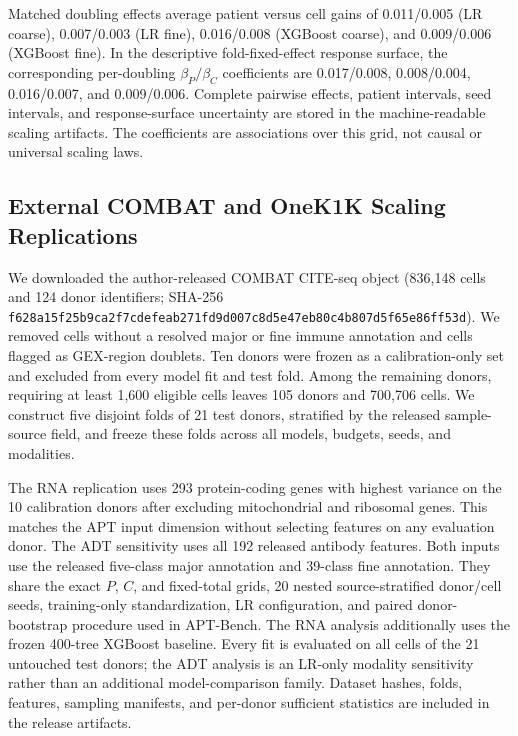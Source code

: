 Matched doubling effects average patient versus cell gains of
0.011/0.005 (LR coarse), 0.007/0.003 (LR fine), 0.016/0.008 (XGBoost coarse),
and 0.009/0.006 (XGBoost fine). In the descriptive fold-fixed-effect response
surface, the corresponding per-doubling $\beta_P/\beta_C$ coefficients are
0.017/0.008, 0.008/0.004, 0.016/0.007, and 0.009/0.006. Complete pairwise
effects, patient intervals, seed intervals, and response-surface uncertainty
are stored in the machine-readable scaling artifacts. The coefficients are
associations over this grid, not causal or universal scaling laws.

\subsection{External COMBAT and OneK1K Scaling Replications}
\label{sec:appendix:combat_scaling}

We downloaded the author-released COMBAT CITE-seq object
\citep{combat2022blood} (836{,}148 cells and 124 donor identifiers; SHA-256
\texttt{f628a15f25b9ca2f7cdefeab271fd9d007c8d5e47eb80c4b807d5f65e86ff53d}).
We removed cells without a resolved major or fine immune annotation and cells
flagged as GEX-region doublets. Ten donors were frozen as a calibration-only
set and excluded from every model fit and test fold. Among the remaining
donors, requiring at least 1{,}600 eligible cells leaves 105 donors and
700{,}706 cells. We construct five disjoint folds of 21 test donors, stratified
by the released sample-source field, and freeze these folds across all models,
budgets, seeds, and modalities.

The RNA replication uses 293 protein-coding genes with highest variance on the
10 calibration donors after excluding mitochondrial and ribosomal genes. This
matches the APT input dimension without selecting features on any evaluation
donor. The ADT sensitivity uses all 192 released antibody features. Both inputs
use the released five-class major annotation and 39-class fine annotation.
They share the exact $P$, $C$, and fixed-total grids, 20 nested source-stratified
donor/cell seeds, training-only standardization, LR configuration, and paired
donor-bootstrap procedure used in APT-Bench. The RNA analysis additionally
uses the frozen 400-tree XGBoost baseline. Every fit is evaluated on all cells
of the 21 untouched test donors; the ADT analysis is an LR-only modality
sensitivity rather than an additional model-comparison family. Dataset hashes,
folds, features, sampling manifests, and per-donor sufficient statistics are
included in the release artifacts.

